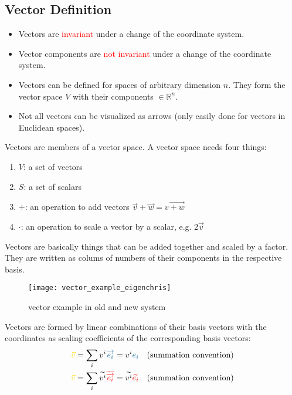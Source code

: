 \subsection{Vector Definition}

\begin{itemize}
  \item Vectors are \textcolor{red}{invariant} under a change of the coordinate system.
  \item Vector components are \textcolor{red}{not invariant} under a change of the
  coordinate system.
  \item Vectors can be defined for spaces of arbitrary dimension $n$. They form the vector
  space $V$ with their components $\in \mathbb{R}^n$.
  \item Not all vectors can be visualized as arrows (only easily done for vectors in
  Euclidean spaces).
\end{itemize}

Vectors are members of a vector space. A vector space needs four things:
\begin{enumerate}
  \item $V$: a set of vectors
  \item $S$: a set of scalars
  \item $+$: an operation to add vectors $\vec{v} + \vec{w} = 
  \overrightarrow{v+w}$
  \item $\cdot$: an operation to scale a vector by a scalar, e.g. $2\vec{v}$
\end{enumerate}
Vectors are basically things that can be added together and scaled by a factor. They are
written as colums of numbers of their components in the respective basis.

\begin{figure}[h]
  \centering
  \texttt{[image: vector\_example\_eigenchris]}
  \caption{vector example in old and new system}
  \label{fig:vector_example_old_new_base}
\end{figure}

Vectors are formed by linear combinations of their basis vectors with the coordinates as
scaling coefficients of the corresponding basis vectors:
\begin{subequations}
  \begin{align}
    \label{eq:vector_def_old}
    \hdv & =  \sum\limits_i \hdvc{i} \hdbv{i} = \hdvc{i} \hdbvc{i}
    \quad\text{(summation convention)} \\
    \label{eq:vector_def_new}
    \hdv & = \sum\limits_i \hdtvc{i} \hdbtv{i} = \hdtvc{i} \hdbtvc{i}
    \quad\text{(summation convention)}
  \end{align}
\end{subequations}

